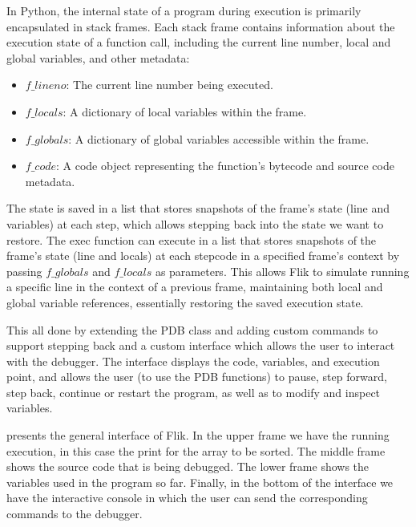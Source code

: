 In Python, the internal state of a program during execution is primarily encapsulated in 
stack frames. Each stack frame contains information about the execution state of a function 
call, including the current line number, local and global variables, and other metadata:
\begin{itemize}
    \item $f\_lineno$: The current line number being executed.
    \item $f\_locals$: A dictionary of local variables within the frame.
    \item $f\_globals$: A dictionary of global variables accessible within the frame.
    \item $f\_code$: A code object representing the function's bytecode and source code metadata.
\end{itemize}
The state is saved in a list that stores snapshots of the frame's state (line and variables) 
at each step, which allows stepping back into the state we want to restore. The exec function can execute 
in a list that stores snapshots of the frame's state (line and locals) at each stepcode in a 
specified frame's context by passing $f\_globals$ and $f\_locals$ as parameters. This allows 
\ac{Flik} to simulate running a specific line in the context of a previous frame, maintaining 
both local and global variable references, essentially restoring the saved execution state.

This all done by extending the PDB class and adding custom commands to support stepping back
and a custom interface which allows the user to interact with the debugger. The interface 
displays the code, variables, and execution point, and allows the user (to use the \ac{PDB} 
functions) to pause, step forward, step back, continue or restart the program, as well as to 
modify and inspect variables. 

 presents the general interface of \ac{Flik}. In 
the upper frame we have the running execution, in this case the print 
for the array to be sorted. The middle frame shows the source code that is being 
debugged. The lower frame shows the variables used in the 
program so far. Finally, in the bottom of the interface we have the interactive console in which the user can 
send the corresponding commands to the debugger.

